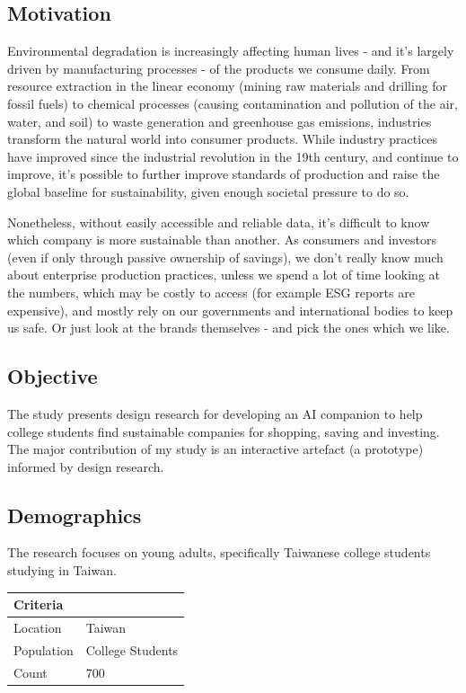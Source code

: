 \documentclass[
  letterpaper,
  DIV=11,
  numbers=noendperiod]{scrartcl}
\begin{document}
\subsection{Motivation}\label{motivation}

Environmental degradation is increasingly affecting human lives - and
it's largely driven by manufacturing processes - of the products we
consume daily. From resource extraction in the linear economy (mining
raw materials and drilling for fossil fuels) to chemical processes
(causing contamination and pollution of the air, water, and soil) to
waste generation and greenhouse gas emissions, industries transform the
natural world into consumer products. While industry practices have
improved since the industrial revolution in the 19th century, and
continue to improve, it's possible to further improve standards of
production and raise the global baseline for sustainability, given
enough societal pressure to do so.

Nonetheless, without easily accessible and reliable data, it's difficult
to know which company is more sustainable than another. As consumers and
investors (even if only through passive ownership of savings), we don't
really know much about enterprise production practices, unless we spend
a lot of time looking at the numbers, which may be costly to access (for
example ESG reports are expensive), and mostly rely on our governments
and international bodies to keep us safe. Or just look at the brands
themselves - and pick the ones which we like.

\subsection{Objective}\label{objective}

The study presents design research for developing an AI companion to
help college students find sustainable companies for shopping, saving
and investing. The major contribution of my study is an interactive
artefact (a prototype) informed by design research.

\subsection{Demographics}\label{demographics}

The research focuses on young adults, specifically Taiwanese college
students studying in Taiwan.

\begin{longtable}[]{@{}ll@{}}
\toprule\noalign{}
Criteria & \\
\midrule\noalign{}
\endhead
\bottomrule\noalign{}
\endlastfoot
Location & Taiwan \\
Population & College Students \\
Count & 700 \\
\end{longtable}
\end{document}
